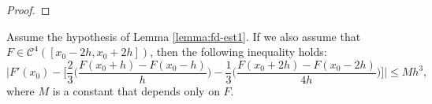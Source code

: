 \begin{proof}
  \renewcommand\qedsymbol{} %
\end{proof}


\begin{lema}
	\label{lemma:fd-bound1}
	Assume the hypothesis of Lemma \ref{lemma:fd-est1}. If we also assume that
	$F \in \mathcal{C}^{4}([x_0-2h,x_0+2h])$, then the following inequality holds:
	\begin{equation}
                \label{lemma:fd-bound1-eq1}
		\bigg|F'(x_0) - \bigg[ \frac{2}{3} \bigg(\frac{F(x_0+h) - F(x_0-h)}{h}\bigg)
                      - \frac{1}{3} \bigg(\frac{F(x_0+2h) - F(x_0-2h)}{4h}\bigg)
		       \bigg] \bigg|  \leq Mh^3,
        \end{equation}
        where $M$ is a constant that depends only on $F$.
\end{lema}

